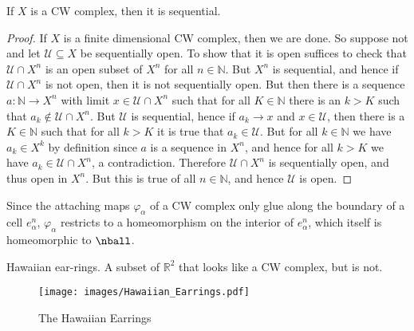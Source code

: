 \documentclass{book}                                                           %
\begin{document}
                    \begin{theorem}
                        If $X$ is a CW complex, then it is sequential.
                    \end{theorem}
                    \begin{proof}
                        If $X$ is a finite dimensional CW complex, then we are
                        done. So suppose not and let $\mathcal{U}\subseteq{X}$
                        be sequentially open. To show that it is open suffices
                        to check that $\mathcal{U}\cap{X}^{n}$ is an open subset
                        of $X^{n}$ for all $n\in\mathbb{N}$. But $X^{n}$ is
                        sequential, and hence if $\mathcal{U}\cap{X}^{n}$ is not
                        open, then it is not sequentially open. But then there
                        is a sequence $a:\mathbb{N}\rightarrow{X}^{n}$ with
                        limit $x\in\mathcal{U}\cap{X}^{n}$ such that for all
                        $K\in\mathbb{N}$ there is an $k>K$ such that
                        $a_{k}\notin\mathcal{U}\cap{X}^{n}$. But $\mathcal{U}$
                        is sequential, hence if $a_{k}\rightarrow{x}$ and
                        $x\in\mathcal{U}$, then there is a $K\in\mathbb{N}$ such
                        that for all $k>K$ it is true that $a_{k}\in\mathcal{U}$.
                        But for all $k\in\mathbb{N}$ we have $a_{k}\in{X}^{k}$
                        by definition since $a$ is a sequence in $X^{n}$, and
                        hence for all $k>K$ we have $a_{k}\in\mathcal{U}\cap{X}^{n}$,
                        a contradiction. Therefore $\mathcal{U}\cap{X}^{n}$ is
                        sequentially open, and thus open in $X^{n}$. But this is
                        true of all $n\in\mathbb{N}$, and hence $\mathcal{U}$ is
                        open.
                    \end{proof}
                    \par\hfill\par
                    Since the attaching maps $\varphi_{\alpha}$ of a CW complex
                    only glue along the boundary of a cell $e_{\alpha}^{n}$,
                    $\varphi_{\alpha}$ restricts to a homeomorphism on the
                    interior of $e_{\alpha}^{n}$, which itself is homeomorphic
                    to $\nball$.
                    \begin{example}
                        Hawaiian ear-rings. A subset of $\mathbb{R}^{2}$ that
                        looks like a CW complex, but is not.
                    \end{example}
                    \begin{figure}[H]
                        \centering
                        \captionsetup{type=figure}
                        \texttt{[image: images/Hawaiian\_Earrings.pdf]}
                        \caption{The Hawaiian Earrings}
                        \label{fig:Hawaiian_Earrings}
                    \end{figure}
\end{document}
